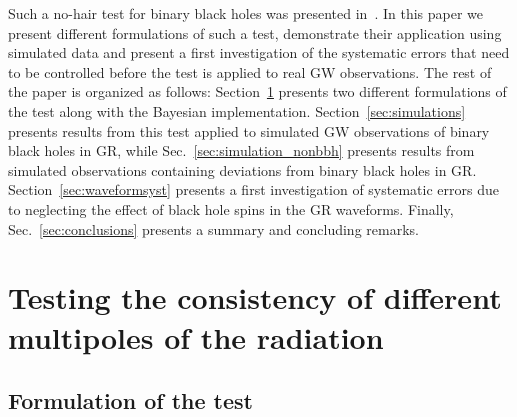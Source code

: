 \documentclass[prd,preprintnumbers,twocolumn,eqsecnum,floatfix,a4paper,nofootinbib,superscriptaddress]{revtex4}
\begin{document}
Such a no-hair test for binary black holes was presented in~\cite{Dhanpal:2018ufk}. In this paper we present different formulations of such a test, demonstrate their application using simulated data and present a first investigation of the systematic errors that need to be controlled before the test is applied to real GW observations. The rest of the paper is organized as follows: Section~\ref{sec:test} presents two different formulations of the test along with the Bayesian implementation. Section~\ref{sec:simulations} presents results from this test applied to simulated GW observations of binary black holes in GR, while Sec.~\ref{sec:simulation_nonbbh} presents results from simulated observations containing deviations from binary black holes in GR. Section~\ref{sec:waveformsyst} presents a first investigation of systematic errors due to neglecting the effect of black hole spins in the GR waveforms. Finally, Sec.~\ref{sec:conclusions} presents a summary and concluding remarks. 

\section{Testing the consistency of different multipoles of the radiation}
\label{sec:test}

\subsection{Formulation of the test}
\end{document}
